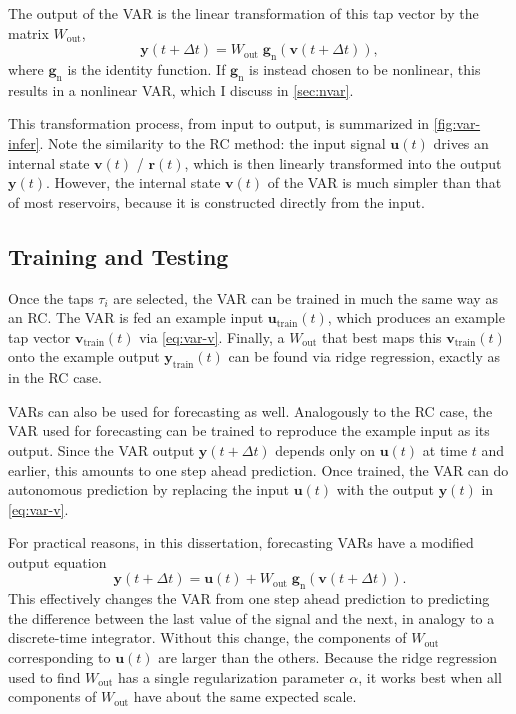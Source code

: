 The output of the VAR is the linear transformation of this tap vector by the matrix $W_\text{out}$,
\begin{equation}
  \label{eq:var-y}
  \bm{y}(t + \Delta t) = W_\text{out}\;\bm{g}_\text{n}\left(\bm{v}(t + \Delta t)\right),
\end{equation}
where $\bm{g}_\text{n}$ is the identity function. If $\bm{g}_\text{n}$
is instead chosen to be nonlinear, this results in a nonlinear VAR,
which I discuss in \cref{sec:nvar}.

This transformation process, from input to output, is summarized in
\cref{fig:var-infer}. Note the similarity to the RC method: the input
signal $\bm{u}(t)$ drives an internal state $\bm{v}(t)$ / $\bm{r}(t)$,
which is then linearly transformed into the output
$\bm{y}(t)$. However, the internal state $\bm{v}(t)$ of the VAR is
much simpler than that of most reservoirs, because it is constructed
directly from the input.

\subsection{Training and Testing}

Once the taps $\tau_i$ are selected, the VAR can be trained in much
the same way as an RC. The VAR is fed an example input
$\bm{u}_\text{train}(t)$, which produces an example tap vector
$\bm{v}_\text{train}(t)$ via \cref{eq:var-v}. Finally, a $W_\text{out}$
that best maps this $\bm{v}_\text{train}(t)$ onto the example output
$\bm{y}_\text{train}(t)$ can be found via ridge regression, exactly as
in the RC case.

VARs can also be used for forecasting as well. Analogously to the RC
case, the VAR used for forecasting can be trained to reproduce the
example input as its output. Since the VAR output $\bm{y}(t + \Delta
t)$ depends only on $\bm{u}(t)$ at time $t$ and earlier, this amounts
to one step ahead prediction. Once trained, the VAR can do autonomous
prediction by replacing the input $\bm{u}(t)$ with the output
$\bm{y}(t)$ in \cref{eq:var-v}.

For practical reasons, in this dissertation, forecasting VARs have a modified
output equation
\begin{equation}
  \bm{y}(t + \Delta t) = \bm{u}(t) + W_\text{out}\;\bm{g}_\text{n}\left(\bm{v}(t + \Delta t)\right).
\end{equation}
This effectively changes the VAR from one step ahead prediction to
predicting the difference between the last value of the signal and the
next, in analogy to a discrete-time integrator. Without this change,
the components of $W_\text{out}$ corresponding to $\bm{u}(t)$ are
larger than the others. Because the ridge regression used to find
$W_\text{out}$ has a single regularization parameter $\alpha$, it
works best when all components of $W_\text{out}$ have about the same
expected scale.

